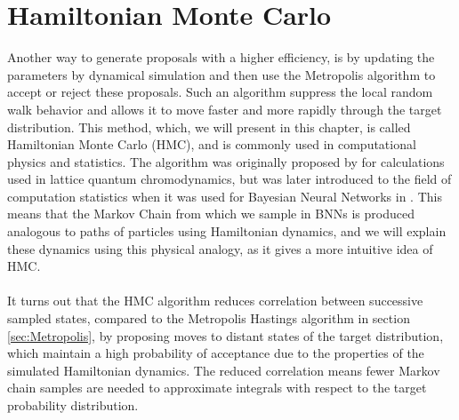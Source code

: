\section{Hamiltonian Monte Carlo}
Another way to generate proposals with a higher efficiency, is by updating the parameters by dynamical simulation and then use the Metropolis algorithm to accept or reject these proposals. Such an algorithm suppress the local random walk behavior and allows it to move faster and more rapidly through the target distribution. This method, which, we will present in this chapter, is called Hamiltonian Monte Carlo (HMC), and is commonly used in computational physics and statistics. The algorithm was originally proposed by \cite{Duane1987216} for calculations used in lattice quantum chromodynamics, but was later introduced to the field of computation statistics when it was used for Bayesian Neural Networks in \cite{neal2012bayesian}. This means that the Markov Chain from which we sample in BNNs is produced analogous to paths of particles using Hamiltonian dynamics, and we will explain these dynamics using this physical analogy, as it gives a more intuitive idea of HMC.
\\
\\
It turns out that the HMC algorithm reduces correlation between successive sampled states, compared to the Metropolis Hastings algorithm in section \ref{sec:Metropolis}, by proposing moves to distant states of the target distribution, which maintain a high probability of acceptance due to the properties of the simulated Hamiltonian dynamics. The reduced correlation means fewer Markov chain samples are needed to approximate integrals with respect to the target probability distribution.

